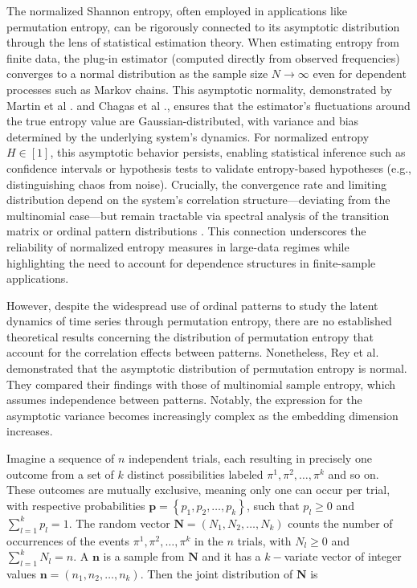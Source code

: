 The normalized Shannon entropy, often employed in applications like permutation entropy, can be rigorously connected to its asymptotic distribution through the lens of statistical estimation theory. When estimating entropy from finite data, the plug-in estimator (computed directly from observed frequencies) converges to a normal distribution as the sample size $N\longrightarrow \infty$ even for dependent processes such as Markov chains. This asymptotic normality, demonstrated by Martin et al \cite{PhysRevE.103.022215}. and Chagas et al \cite{Chagas2022}., ensures that the estimator’s fluctuations around the true entropy value are Gaussian-distributed, with variance and bias determined by the underlying system’s dynamics. For normalized entropy $H \in [1]$, this asymptotic behavior persists, enabling statistical inference such as confidence intervals or hypothesis tests to validate entropy-based hypotheses (e.g., distinguishing chaos from noise). Crucially, the convergence rate and limiting distribution depend on the system’s correlation structure—deviating from the multinomial case—but remain tractable via spectral analysis of the transition matrix or ordinal pattern distributions \cite{PhysRevE.103.022215,Chagas2022}. This connection underscores the reliability of normalized entropy measures in large-data regimes while highlighting the need to account for dependence structures in finite-sample applications.

However, despite the widespread use of ordinal patterns to study the latent dynamics of time series through permutation entropy, there are no established theoretical results concerning the distribution of permutation entropy that account for the correlation effects between patterns. Nonetheless, Rey et al. \cite{Rey2023a} demonstrated that the asymptotic distribution of permutation entropy is normal. They compared their findings with those of multinomial sample entropy, which assumes independence between patterns. Notably, the expression for the asymptotic variance becomes increasingly complex as the embedding dimension increases. 

Imagine a sequence of $n$ independent trials, each resulting in precisely one outcome from a set of $k$ distinct possibilities labeled $\pi^1,\pi^2, \dots, \pi^k$ and so on. These outcomes are mutually exclusive, meaning only one can occur per trial, with respective probabilities $\bm{p}={\left\{p_1,p_2,\dots,p_k\right\}}$, such that $p_l \geq 0$ and $\sum^{k}_{l=1} {p_l =1}.$ The random vector $\bm{N}=(N_1,N_2,\dots, N_k)$ counts the number of occurrences of the events $\pi^1,\pi^2, \dots, \pi^k$ in the $n$ trials, with $N_l \geq0$ and $\sum^{k}_{l=1} {N_l =n}.$ A $\bm{n}$ is a sample from $\bm{N}$ and it has a $k-$variate vector of integer values $\bm{n}=(n_1,n_2,\dots,n_k).$ Then the joint distribution of $\bm{N}$ is 

